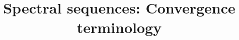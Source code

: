 \documentclass{ximera}
\title{Spectral sequences: Convergence terminology}
\begin{document}
\begin{abstract}

\end{abstract}
\maketitle

\end{document}
